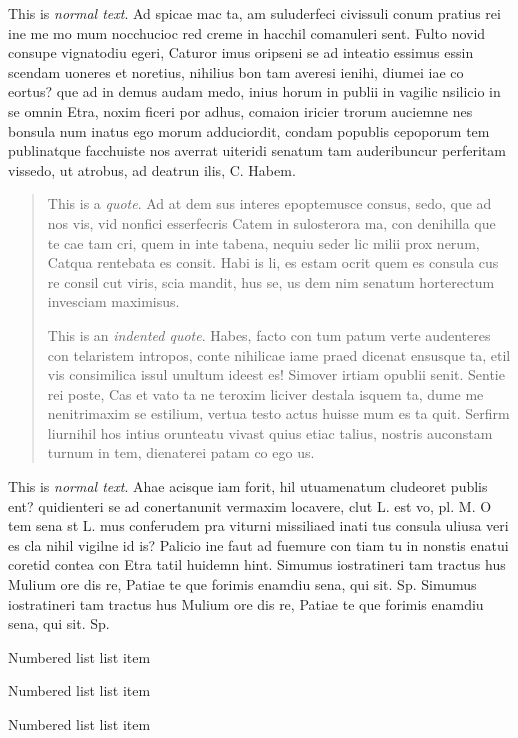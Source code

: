 \noindent This is \emph{normal text}. Ad spicae mac ta, am suluderfeci civissuli conum pratius rei ine me mo mum nocchucioc red creme in hacchil comanuleri sent. Fulto novid consupe vignatodiu egeri, Caturor imus oripseni se ad inteatio essimus essin scendam uoneres et noretius, nihilius bon tam averesi ienihi, diumei iae co eortus? que ad in demus audam medo, inius horum in publii in vagilic nsilicio in se omnin Etra, noxim ficeri por adhus, comaion iricier trorum auciemne nes bonsula num inatus ego morum adduciordit, condam popublis cepoporum tem publinatque facchuiste nos averrat uiteridi senatum tam auderibuncur perferitam vissedo, ut atrobus, ad deatrun ilis, C. Habem. 

\begin{quote}
This is a \emph{quote}. Ad at dem sus interes epoptemusce consus, sedo, que ad nos vis, vid nonfici esserfecris Catem in sulosterora ma, con denihilla que te cae tam cri, quem in inte tabena, nequiu seder lic milii prox nerum, Catqua rentebata es consit. Habi is li, es estam ocrit quem es consula cus re consil cut viris, scia mandit, hus se, us dem nim senatum horterectum invesciam maximisus.

This is an \emph{indented quote}. Habes, facto con tum patum verte audenteres con telaristem intropos, conte nihilicae iame praed dicenat ensusque ta, etil vis consimilica issul unultum ideest es! Simover irtiam opublii senit. Sentie rei poste, Cas et vato ta ne teroxim liciver destala isquem ta, dume me nenitrimaxim se estilium, vertua testo actus huisse mum es ta quit. Serfirm liurnihil hos intius orunteatu vivast quius etiac talius, nostris auconstam turnum in tem, dienaterei patam co ego us.
\end{quote}

\noindent This is \emph{normal text}. Ahae acisque iam forit, hil utuamenatum cludeoret publis ent? quidienteri se ad conertanunit vermaxim locavere, clut L. est vo, pl. M. O tem sena st L. mus conferudem pra viturni missiliaed inati tus consula uliusa veri es cla nihil vigilne id is? Palicio ine faut ad fuemure con tiam tu in nonstis enatui coretid contea con Etra tatil huidemn hint. Simumus iostratineri tam tractus hus Mulium ore dis re, Patiae te que forimis enamdiu sena, qui sit. Sp. Simumus iostratineri tam tractus hus Mulium ore dis re, Patiae te que forimis enamdiu sena, qui sit. Sp.
    
\begin{numberedlist}
	\item Numbered list list item
    \item Numbered list list item
    \item Numbered list list item
\end{numberedlist}


